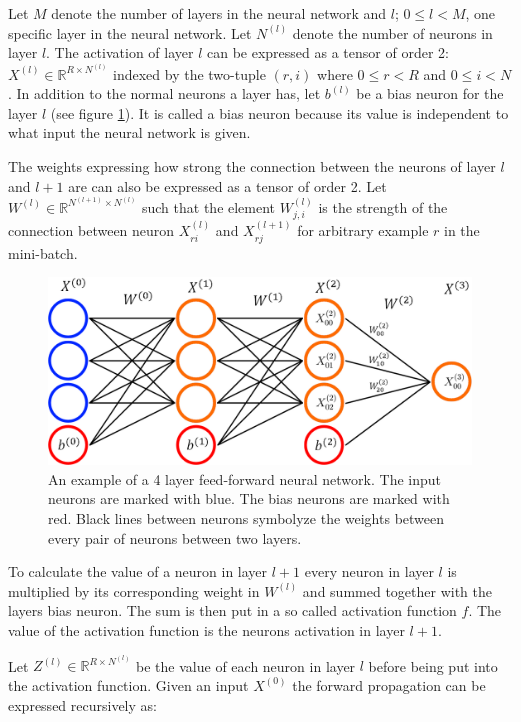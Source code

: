 \documentclass[a4paper,11pt,twoside]{article}
\begin{document}
Let $M$ denote the number of layers in the neural network and $l$; $0 \leq l < M$, one specific layer in the neural network. Let $N^{(l)}$ denote the number of neurons in layer $l$. The activation of layer $l$ can be expressed as a tensor of order 2: $X^{(l)} \in \mathbb{R}^{R \times N^{(l)}}$ indexed by the two-tuple $(r,i)$ where $0 \leq r < R$ and $0 \leq i < N$. In addition to the normal neurons a layer has, let $b^{(l)}$ be a bias neuron for the layer $l$ (see figure \ref{figFCCmath}). It is called a bias neuron because its value is independent to what input the neural network is given. \cite{cs231n} \cite{wikiStanford}

The weights expressing how strong the connection between the neurons of layer $l$ and $l+1$ are can also be expressed as a tensor of order 2. Let $W^{(l)} \in \mathbb{R}^{N^{(l+1)}  \times N^{(l)}}$ such that the element $W_{j, i}^{(l)}$ is the strength of the connection between neuron $X_{ri}^{(l)}$ and $X_{rj}^{(l+1)}$ for arbitrary example $r$ in the mini-batch. \cite{cs231n} \cite{wikiStanford}

\begin{figure}[h]
	\centering
  		\includegraphics[scale=0.4]{FCC.png}
  	\caption{An example of a 4 layer feed-forward neural network. The input neurons are marked with blue. The bias neurons are marked with red. Black lines between neurons symbolyze the weights between every pair of neurons between two layers.} \label{figFCCmath}
\end{figure}

To calculate the value of a neuron in layer $l+1$ every neuron in layer $l$ is multiplied by its corresponding weight in $W^{(l)}$ and summed together with the layers bias neuron. The sum is then put in a so called activation function $f$. The value of the activation function is the neurons activation in layer $l+1$. \cite{cs231n} \cite{wikiStanford}

Let $Z^{(l)} \in \mathbb{R}^{R \times N^{(l)}}$ be the value of each neuron in layer $l$ before being put into the activation function. Given an input $X^{(0)}$ the forward propagation can be expressed recursively as: \cite{cs231n} \cite{wikiStanford}
\end{document}
